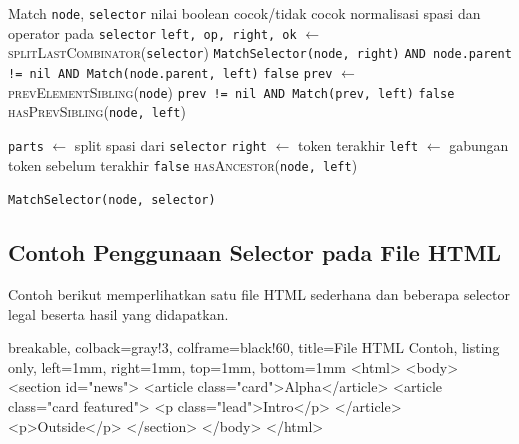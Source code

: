 \begin{ieeealgorithm}{Match}
    \Require \texttt{node}, \texttt{selector}
    \Ensure nilai boolean cocok/tidak cocok
    \State normalisasi spasi dan operator pada \texttt{selector}
    \State \texttt{left, op, right, ok} $\gets$ \textsc{splitLastCombinator}(\texttt{selector})
    \State \Return \texttt{MatchSelector(node, right)}
    \Statex \hspace{2.05em} \texttt{AND node.parent != nil AND Match(node.parent, left)}
    \State \Return \texttt{false}
    \EndIf
    \State \texttt{prev} $\gets$ \textsc{prevElementSibling}(\texttt{node})
    \State \Return \texttt{prev != nil AND Match(prev, left)}
    \State \Return \texttt{false}
    \EndIf
    \State \Return \textsc{hasPrevSibling}(\texttt{node, left})
    \EndIf
    \EndIf

    \State \texttt{parts} $\gets$ split spasi dari \texttt{selector}
    \State \texttt{right} $\gets$ token terakhir
    \State \texttt{left} $\gets$ gabungan token sebelum terakhir
    \State \Return \texttt{false}
    \EndIf
    \State \Return \textsc{hasAncestor}(\texttt{node, left})
    \EndIf

    \State \Return \texttt{MatchSelector(node, selector)}
\end{ieeealgorithm}

\subsection{Contoh Penggunaan Selector pada File HTML}

Contoh berikut memperlihatkan satu file HTML sederhana dan beberapa selector legal beserta hasil yang didapatkan.

\begin{tcblisting}{
        breakable,
        colback=gray!3,
        colframe=black!60,
        title=File HTML Contoh,
        listing only,
        left=1mm,
        right=1mm,
        top=1mm,
        bottom=1mm
    }
    <html>
    <body>
    <section id="news">
    <article class="card">Alpha</article>
    <article class="card featured">
    <p class="lead">Intro</p>
    </article>
    <p>Outside</p>
    </section>
    </body>
    </html>
\end{tcblisting}

